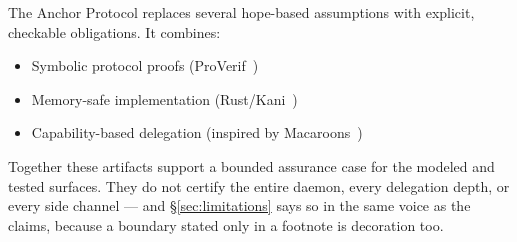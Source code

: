 \documentclass[11pt,a4paper]{article}
\theoremstyle{definition}
\begin{document}
The Anchor Protocol replaces several hope-based assumptions with explicit, checkable obligations. It combines:

\begin{itemize}
  \item Symbolic protocol proofs (ProVerif~\cite{blanchet2016modeling})
  \item Memory-safe implementation (Rust/Kani~\cite{aws2022kani})
  \item Capability-based delegation (inspired by Macaroons~\cite{birgisson2014macaroons})
\end{itemize}

Together these artifacts support a bounded assurance case for the modeled and tested surfaces. They do not certify the entire daemon, every delegation depth, or every side channel --- and \S\ref{sec:limitations} says so in the same voice as the claims, because a boundary stated only in a footnote is decoration too.
\end{document}

